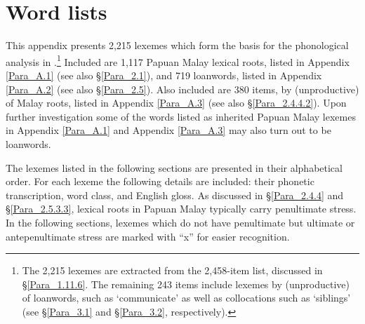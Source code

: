 \chapter{Word lists}
\label{Para_A}
This appendix presents 2,215 lexemes which form the basis for the phonological analysis in .\footnote{The 2,215 lexemes are extracted from the 2,458-item list, discussed in §\ref{Para_1.11.6}. The remaining 243 items include lexemes  by (unproductive)  of loanwords, such as  ‘communicate’ as well as collocations such as  ‘siblings’ (see §\ref{Para_3.1} and §\ref{Para_3.2}, respectively).} Included are 1,117 Papuan Malay lexical roots, listed in Appendix \ref{Para_A.1} (see also §\ref{Para_2.1}), and 719 loanwords, listed in Appendix \ref{Para_A.2} (see also §\ref{Para_2.5}). Also included are 380 items,  by (unproductive)  of Malay roots, listed in Appendix \ref{Para_A.3} (see also §\ref{Para_2.4.4.2}). Upon further investigation some of the words listed as inherited Papuan Malay lexemes in Appendix \ref{Para_A.1} and Appendix \ref{Para_A.3} may also turn out to be loanwords.

The lexemes listed in the following sections are presented in their alphabetical order. For each lexeme the following details are included: their phonetic transcription, word class, and English gloss. As discussed in §\ref{Para_2.4.4} and §\ref{Para_2.5.3.3}, lexical roots in Papuan Malay typically carry penultimate stress. In the following sections, lexemes which do not have penultimate but ultimate or antepenultimate stress are marked with “x” for easier recognition.

